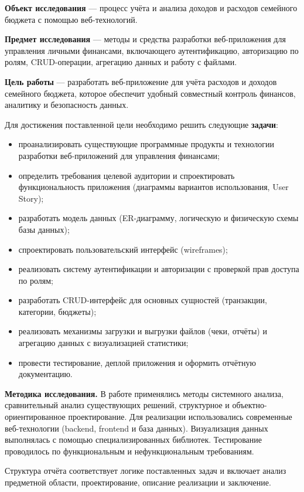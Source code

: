 \textbf{Объект исследования} — процесс учёта и анализа доходов и расходов семейного бюджета с помощью веб-технологий.

\textbf{Предмет исследования} — методы и средства разработки веб-приложения для управления личными финансами, включающего аутентификацию, авторизацию по ролям, CRUD-операции, агрегацию данных и работу с файлами.

\textbf{Цель работы} — разработать веб-приложение для учёта расходов и доходов семейного бюджета, которое обеспечит удобный совместный контроль финансов, аналитику и безопасность данных.

Для достижения поставленной цели необходимо решить следующие \textbf{задачи}:

\begin{itemize}
    \item проанализировать существующие программные продукты и технологии разработки веб-приложений для управления финансами;
    \item определить требования целевой аудитории и спроектировать функциональность приложения (диаграммы вариантов использования, User Story);
    \item разработать модель данных (ER-диаграмму, логическую и физическую схемы базы данных);
    \item спроектировать пользовательский интерфейс (wireframes);
    \item реализовать систему аутентификации и авторизации с проверкой прав доступа по ролям;
    \item разработать CRUD-интерфейс для основных сущностей (транзакции, категории, бюджеты);
    \item реализовать механизмы загрузки и выгрузки файлов (чеки, отчёты) и агрегацию данных с визуализацией статистики;
    \item провести тестирование, деплой приложения и оформить отчётную документацию.
\end{itemize}

\textbf{Методика исследования.} В работе применялись методы системного анализа, сравнительный анализ существующих решений, структурное и объектно-ориентированное проектирование. Для реализации использовались современные веб-технологии (backend, frontend и база данных). Визуализация данных выполнялась с помощью специализированных библиотек. Тестирование проводилось по функциональным и нефункциональным требованиям.

Структура отчёта соответствует логике поставленных задач и включает анализ предметной области, проектирование, описание реализации и заключение.
